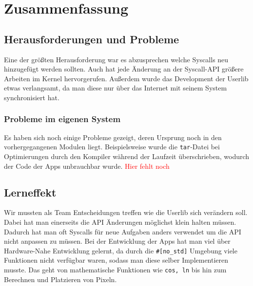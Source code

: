 \section{Zusammenfassung}

\subsection{Herausforderungen und Probleme}
    Eine der größten Herausforderung war es abzusprechen welche Syscalls neu hinzugefügt werden sollten. Auch hat jede Änderung an der Syscall-API größere Arbeiten im Kernel hervorgerufen. Außerdem wurde das Development der Userlib etwas verlangsamt, da man diese nur über das Internet mit seinem System synchronisiert hat. \newline
    \subsubsection{Probleme im eigenen System}
        Es haben sich noch einige Probleme gezeigt, deren Ursprung noch in den vorhergegangenen Modulen liegt. Beispielsweise wurde die \verb|tar|-Datei bei Optimierungen durch den Kompiler während der Laufzeit überschrieben, wodurch der Code der Apps unbrauchbar wurde. \textcolor{red}{Hier fehlt noch}

\subsection{Lerneffekt}
    Wir mussten als Team Entscheidungen treffen wie die Userlib sich verändern soll. Dabei hat man einerseits die API Änderungen möglichst klein halten müssen. Dadurch hat man oft Syscalls für neue Aufgaben anders verwendet um die API nicht anpassen zu müssen. \newline
    Bei der Entwicklung der Apps hat man viel über Hardware-Nahe Entwicklung gelernt, da durch die \verb|#[no_std]| Umgebung viele Funktionen nicht verfügbar waren, sodass man diese selber Implementieren musste. Das geht von mathematische Funktionen wie \verb|cos, ln| bis hin zum Berechnen und Platzieren von Pixeln.
